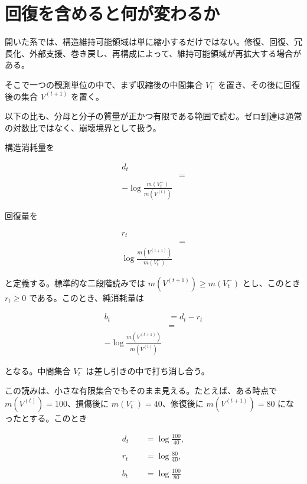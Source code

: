 \documentclass[12pt,a4paper]{article}
\begin{document}
\section{回復を含めると何が変わるか}\label{ux56deux5fa9ux3092ux542bux3081ux308bux3068ux4f55ux304cux5909ux308fux308bux304b}

開いた系では、構造維持可能領域は単に縮小するだけではない。修復、回復、冗長化、外部支援、巻き戻し、再構成によって、維持可能領域が再拡大する場合がある。

そこで一つの観測単位の中で、まず収縮後の中間集合 \(V_{t}^-\) を置き、その後に回復後の集合 \(V^{(t+1)}\) を置く。

以下の比も、分母と分子の質量が正かつ有限である範囲で読む。ゼロ到達は通常の対数比ではなく、崩壊境界として扱う。

構造消耗量を

\[
\begin{aligned}
d_{t} \\
&= \\
-\log\frac{m(V_{t}^-)}{m(V^{(t)})}
\end{aligned}
\]

回復量を

\[
\begin{aligned}
r_{t} \\
&= \\
\log\frac{m(V^{(t+1)})}{m(V_{t}^-)}
\end{aligned}
\]

と定義する。標準的な二段階読みでは \(m(V^{(t+1)})\ge m(V_{t}^-)\) とし、このとき \(r_{t}\ge0\) である。このとき、純消耗量は

\[
\begin{aligned}
b_{t}&=d_{t}-r_{t} \\
&= \\
-\log\frac{m(V^{(t+1)})}{m(V^{(t)})}
\end{aligned}
\]

となる。中間集合 \(V_{t}^-\) は差し引きの中で打ち消し合う。

この読みは、小さな有限集合でもそのまま見える。たとえば、ある時点で \(m(V^{(t)})=100\)、損傷後に \(m(V_{t}^-)=40\)、修復後に \(m(V^{(t+1)})=80\) になったとする。このとき

\[
\begin{aligned}
d_{t}&=\log\frac{100}{40}, \\
\qquad \\
r_{t}&=\log\frac{80}{40}, \\
\qquad \\
b_{t}&=\log\frac{100}{80}
\end{aligned}
\]
\end{document}

